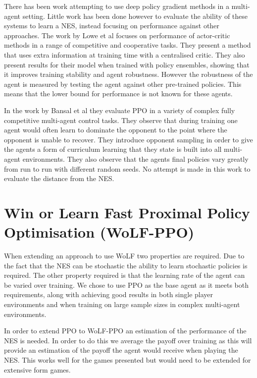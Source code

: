\documentclass[conference]{IEEEtran}
\begin{document}
There has been work attempting to use deep policy gradient methods in a multi-agent setting. Little work has been done however to evaluate the ability of these systems to learn a NES, instead focusing on performance against other approaches. The work by Lowe et al\cite{lowe2017multi} focuses on performance of actor-critic methods in a range of competitive and cooperative tasks. They present a method that uses extra information at training time with a centralised critic. They also present results for their model when trained with policy ensembles, showing that it improves training stability and agent robustness. However the robustness of the agent is measured by testing the agent against other pre-trained policies. This means that the lower bound for performance is not known for these agents.

In the work by Bansal et al\cite{bansal2017emergent} they evaluate PPO in a variety of complex fully competitive multi-agent control tasks. They observe that during training one agent would often learn to dominate the opponent to the point where the opponent is unable to recover. They introduce opponent sampling in order to give the agents a form of curriculum learning that they state is built into all multi-agent environments. They also observe that the agents final policies vary greatly from run to run with different random seeds. No attempt is made in this work to evaluate the distance from the NES.

\section{Win or Learn Fast Proximal Policy Optimisation (WoLF-PPO)}

When extending an approach to use WoLF two properties are required. Due to the fact that the NES can be stochastic the ability to learn stochastic policies is required. The other property required is that the learning rate of the agent can be varied over training. We chose to use PPO as the base agent as it meets both requirements, along with achieving good results in both single player environments and when training on large sample sizes in complex multi-agent environments\cite{OpenAI_dota}. 

In order to extend PPO to WoLF-PPO an estimation of the performance of the NES is needed. In order to do this we average the payoff over training as this will provide an estimation of the payoff the agent would receive when playing the NES. This works well for the games presented but would need to be extended for extensive form games.
\end{document}
